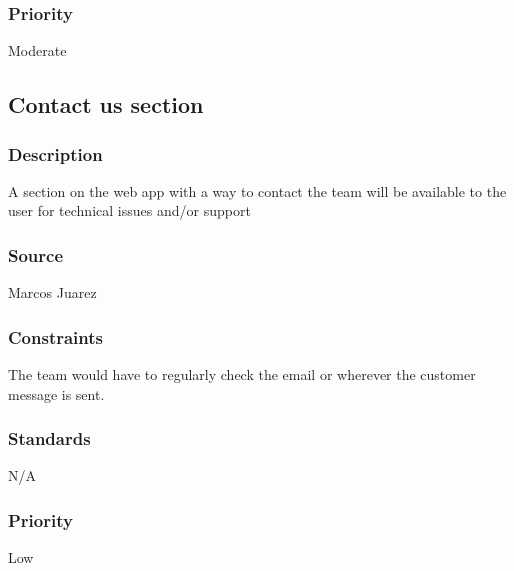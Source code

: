 \subsubsection{Priority}
Moderate

\subsection{Contact us section}
\subsubsection{Description}
A section on the web app with a way to contact the team will be available to the user for technical issues and/or support
\subsubsection{Source}
Marcos Juarez
\subsubsection{Constraints}
The team would have to regularly check the email or wherever the customer message is sent.
\subsubsection{Standards}
N/A
\subsubsection{Priority}
Low